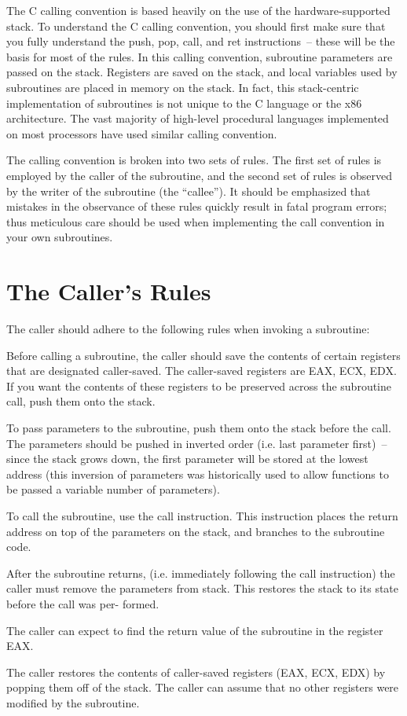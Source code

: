 The C calling convention is based heavily on the use of the
hardware-supported stack. To understand the C calling convention, you
should first make sure that you fully understand the push, pop, call,
and ret instructions~-- these will be the basis for most of the rules.
In this calling convention, subroutine parameters are passed on the
stack. Registers are saved on the stack, and local variables used by
subroutines are placed in memory on the stack. In fact, this
stack-centric implementation of subroutines is not unique to the C
language or the x86 architecture. The vast majority of high-level
procedural languages implemented on most processors have used similar
calling convention.

The calling convention is broken into two sets of rules. The first set
of rules is employed by the caller of the subroutine, and the second
set of rules is observed by the writer of the subroutine (the
``callee''). It should be emphasized that mistakes in the observance
of these rules quickly result in fatal program errors; thus meticulous
care should be used when implementing the call convention in your own
subroutines.

\section{The Caller's Rules}

The caller should adhere to the following rules when invoking a
subroutine:

\begin{numlist}
\item Before calling a subroutine, the caller should save the contents
  of certain registers that are designated caller-saved. The
  caller-saved registers are EAX, ECX, EDX. If you want the contents
  of these registers to be preserved across the subroutine call, push
  them onto the stack.
\item To pass parameters to the subroutine, push them onto the stack
  before the call. The parameters should be pushed in inverted order
  (i.e. last parameter first)~-- since the stack grows down, the first
  parameter will be stored at the lowest address (this inversion of
  parameters was historically used to allow functions to be passed a
  variable number of parameters).
\item To call the subroutine, use the call instruction. This
  instruction places the return address on top of the parameters on
  the stack, and branches to the subroutine code.
\item After the subroutine returns, (i.e. immediately following the
  call instruction) the caller must remove the parameters from stack.
  This restores the stack to its state before the call was per-
  formed.
\item The caller can expect to find the return value of the subroutine
  in the register EAX.
\item The caller restores the contents of caller-saved registers (EAX,
  ECX, EDX) by popping them off of the stack. The caller can assume
  that no other registers were modified by the subroutine.
\end{numlist}

